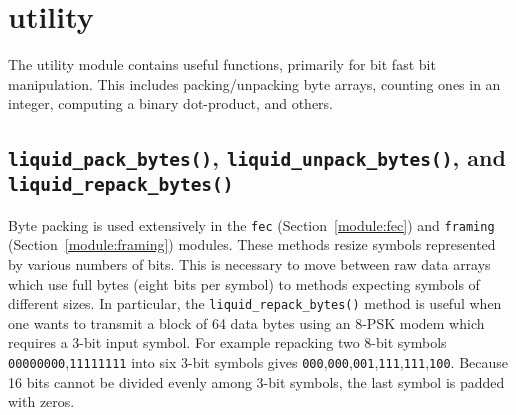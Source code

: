 % 
%

\newpage
\section{utility}
\label{module:utility}
The utility module contains useful functions, primarily for bit fast bit
manipulation.
This includes packing/unpacking byte arrays, counting ones in an integer,
computing a binary dot-product, and others.

\subsection{{\tt liquid\_pack\_bytes()},
            {\tt liquid\_unpack\_bytes()}, and
            {\tt liquid\_repack\_bytes()}}
\label{module:utility:pack_bytes}
Byte packing is used extensively in the
{\tt fec} (Section~\ref{module:fec}) and
{\tt framing} (Section~\ref{module:framing}) modules.
These methods resize symbols represented by various numbers of bits.
This is necessary to move between raw data arrays which use full bytes (eight
bits per symbol) to methods expecting symbols of different sizes.
In particular, the {\tt liquid\_repack\_bytes()} method is useful when one wants
to transmit a block of 64 data bytes using an 8-PSK modem which requires a
3-bit input symbol.
For example repacking two 8-bit symbols {\tt 00000000},{\tt 11111111} into six
3-bit symbols gives
{\tt 000},{\tt 000},{\tt 001},{\tt 111},{\tt 111},{\tt 100}.
Because 16 bits cannot be divided evenly among 3-bit symbols, the last symbol
is padded with zeros.

